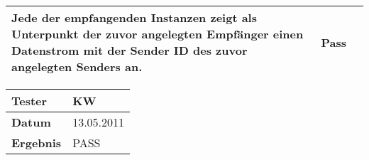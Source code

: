 \begin{table}[h]
\begin{center}
\begin{tabular}{|p{4cm}|p{7.8cm}|p{2.3cm}|}
                    Jede der empfangenden Instanzen zeigt als Unterpunkt der
                    zuvor angelegten Empfänger einen Datenstrom mit der Sender ID
                    des zuvor angelegten Senders an.& Pass\\
                \hline
            \end{tabular}
                   \begin{tabular}{|p{3.5cm}|p{11cm}|}
                \textbf{Tester} & KW\\
                \hline
                \textbf{Datum} & 13.05.2011\\
                \hline
                \textbf{Ergebnis} & PASS\\
                \hline
            \end{tabular}
        \end{center}
    \end{table}

